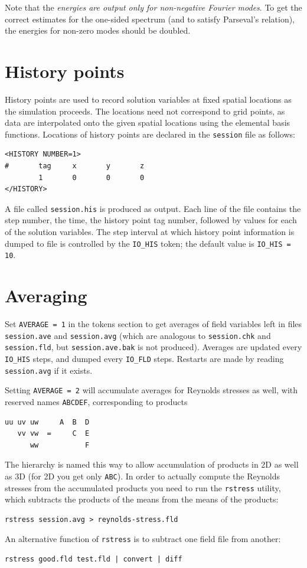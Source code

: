 \documentclass[11pt]{report}
\begin{document}
Note that the \emph{energies are output only for non-negative Fourier
modes}.  To get the correct estimates for the one-sided spectrum (and
to satisfy Parseval's relation), the energies for non-zero modes
should be doubled.

\section{History points}
\label{sec.history}

History points are used to record solution variables at fixed spatial
locations as the simulation proceeds.  The locations need not
correspond to grid points, as data are interpolated onto the given
spatial locations using the elemental basis functions.  Locations of
history points are declared in the \verb+session+ file as follows:
%
{\small
\begin{verbatim}
<HISTORY NUMBER=1>
#       tag     x       y       z 
        1       0       0       0
</HISTORY>
\end{verbatim}
}
%
A file called \verb+session.his+ is produced as output.  Each line of
the file contains the step number, the time, the history point tag
number, followed by values for each of the solution variables.  The
step interval at which history point information is dumped to file is
controlled by the \verb+IO_HIS+ token; the default value is
\verb+IO_HIS = 10+.

\section{Averaging}
\label{sec.average}

Set \verb+AVERAGE = 1+ in the tokens section to get averages of field
variables left in files \verb+session.ave+ and \verb+session.avg+
(which are analogous to \verb+session.chk+ and \verb+session.fld+, but
\verb+session.ave.bak+ is not produced).  Averages are updated
every \verb+IO_HIS+ steps, and dumped every \verb+IO_FLD+ steps.
Restarts are made by reading \verb+session.avg+ if it exists.

Setting \verb+AVERAGE = 2+ will accumulate averages for Reynolds
stresses as well, with reserved names \verb+ABCDEF+, corresponding to
products
%
{\small
\begin{verbatim}
uu uv uw     A  B  D
   vv vw  =     C  E
      ww           F
\end{verbatim}
}
%
The hierarchy is named this way to allow accumulation of products in 2D
as well as 3D (for 2D you get only \verb+ABC+).  In order to actually
compute the Reynolds stresses from the accumulated products you need
to run the \verb+rstress+ utility, which subtracts the products of the
means from the means of the products:
\begin{verbatim}
rstress session.avg > reynolds-stress.fld
\end{verbatim}
An alternative function of \verb+rstress+ is to subtract one field
file from another:
\begin{verbatim}
rstress good.fld test.fld | convert | diff
\end{verbatim}
\end{document}
